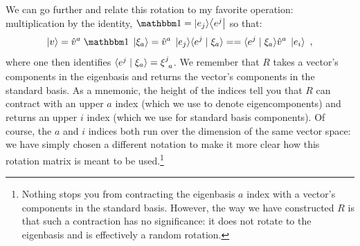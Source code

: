 \documentclass[12pt, oneside]{report}    %
\begin{document}
We can go further and relate this rotation to my favorite operation: multiplication by the identity, $\one = \ket{e_j}\!\bra{e^j}$ so that:
\begin{align}
    \ket{v} = 
    \hat v^a\; \one \;\ket{\xi_a}
    = \hat v^a\; \ket{e_j}\!\la e^j\mid \xi_a \ra 
    =
    = \la e^j\mid \xi_a \ra  \hat v^a\;\ket{e_i} \ ,
    \label{eq:vA:as:vi:insert:one}
\end{align}
where one then identifies $\la e^j\mid \xi_a \ra = \xi\aij{j}{a}$.
% 
% 
We remember that $R$ takes a vector's components in the eigenbasis and returns the vector's components in the standard basis. As a mnemonic, the height of the indices tell you that $R$ can contract with an upper $a$ index (which we use to denote eigencomponents) and returns an upper $i$ index (which we use for standard basis components). Of course, the $a$ and $i$ indices both run over the dimension of the same vector space: we have simply chosen a different notation to make it more clear how this rotation matrix is meant to be used.\footnote{Nothing stops you from contracting the eigenbasis $a$ index with a vector's components in the standard basis. However, the way we have constructed $R$ is that such a contraction has no significance: it does not rotate to the eigenbasis and is effectively a random rotation. }
\end{document}

